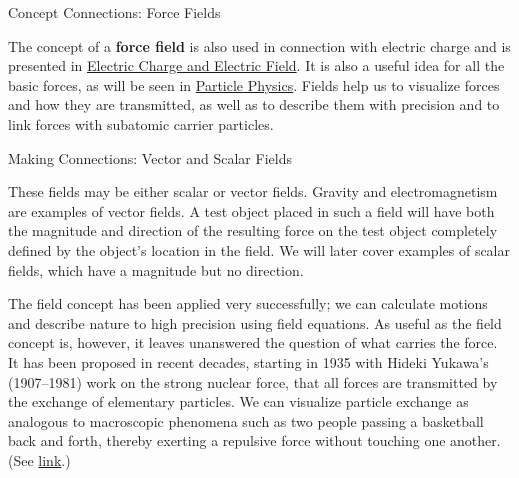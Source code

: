 \documentclass[
]{book}
\begin{document}
\hypertarget{fs-id2639325}{}
Concept Connections: Force Fields

The concept of a \textbf{force field} is also used in connection with
electric charge and is presented in \href{/m55297}{Electric Charge and Electric
Field}. It is also a useful idea for all the basic forces, as
will be seen in \href{/m54854}{Particle Physics}. Fields help us to visualize
forces and how they are transmitted, as well as to describe them with
precision and to link forces with subatomic carrier particles.

\hypertarget{fs-id1421634}{}
\leavevmode{}%
Making Connections: Vector and Scalar Fields

These fields may be either scalar or vector fields. Gravity and
electromagnetism are examples of vector fields. A test object placed in
such a field will have both the magnitude and direction of the resulting
force on the test object completely defined by the object's location in
the field. We will later cover examples of scalar fields, which have a
magnitude but no direction.

The field concept has been applied very successfully; we can calculate
motions and describe nature to high precision using field equations. As
useful as the field concept is, however, it leaves unanswered the
question of what carries the force. It has been proposed in recent
decades, starting in 1935 with Hideki Yukawa's (1907--1981) work on the
strong nuclear force, that all forces are transmitted by the exchange of
elementary particles. We can visualize particle exchange as analogous to
macroscopic phenomena such as two people passing a basketball back and
forth, thereby exerting a repulsive force without touching one another.
(See \protect\hyperlink{import-auto-id2011579}{link}.)
\end{document}
